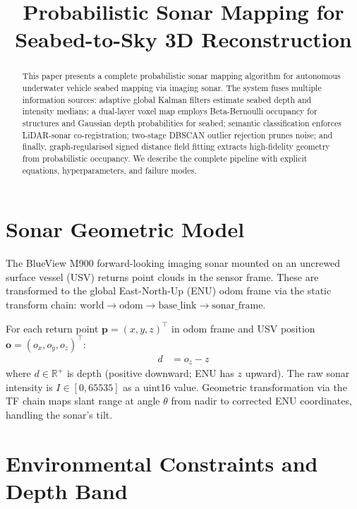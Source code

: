 \documentclass[10pt,twocolumn]{article}
\title{Probabilistic Sonar Mapping for Seabed-to-Sky 3D Reconstruction}
\author{}
\date{}
\begin{document}
\maketitle

\begin{abstract}
This paper presents a complete probabilistic sonar mapping algorithm for autonomous underwater vehicle seabed mapping via imaging sonar. The system fuses multiple information sources: adaptive global Kalman filters estimate seabed depth and intensity medians; a dual-layer voxel map employs Beta-Bernoulli occupancy for structures and Gaussian depth probabilities for seabed; semantic classification enforces LiDAR-sonar co-registration; two-stage DBSCAN outlier rejection prunes noise; and finally, graph-regularised signed distance field fitting extracts high-fidelity geometry from probabilistic occupancy. We describe the complete pipeline with explicit equations, hyperparameters, and failure modes.
\end{abstract}

\section{Sonar Geometric Model}

The BlueView M900 forward-looking imaging sonar mounted on an uncrewed surface vessel (USV) returns point clouds in the sensor frame. These are transformed to the global East-North-Up (ENU) odom frame via the static transform chain: $\text{world} \to \text{odom} \to \text{base\_link} \to \text{sonar\_frame}$.

For each return point $\mathbf{p} = (x, y, z)^\top$ in odom frame and USV position $\mathbf{o} = (o_x, o_y, o_z)^\top$:
\begin{align}
d &= o_z - z \label{eq:depth}
\end{align}
where $d \in \mathbb{R}^+$ is depth (positive downward; ENU has $z$ upward). The raw sonar intensity is $I \in [0, 65535]$ as a uint16 value. Geometric transformation via the TF chain maps slant range at angle $\theta$ from nadir to corrected ENU coordinates, handling the sonar's tilt.

\section{Environmental Constraints and Depth Band}
\end{document}
